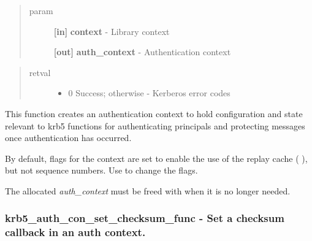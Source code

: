 \documentclass[letterpaper,10pt,english]{sphinxmanual}
\begin{document}
\begin{fulllineitems}
\label{appdev/refs/api/krb5_auth_con_init:c.krb5_auth_con_init}
\end{fulllineitems}

\begin{quote}\begin{description}
\item[{param}] \leavevmode
\textbf{{[}in{]}} \textbf{context} - Library context

\textbf{{[}out{]}} \textbf{auth\_context} - Authentication context

\end{description}\end{quote}
\begin{quote}\begin{description}
\item[{retval}] \leavevmode\begin{itemize}
\item {} 
0   Success; otherwise - Kerberos error codes

\end{itemize}

\end{description}\end{quote}

This function creates an authentication context to hold configuration and state relevant to krb5 functions for authenticating principals and protecting messages once authentication has occurred.

By default, flags for the context are set to enable the use of the replay cache ( {\hyperref[appdev/refs/macros/KRB5_AUTH_CONTEXT_DO_TIME:KRB5_AUTH_CONTEXT_DO_TIME]{}} ), but not sequence numbers. Use {\hyperref[appdev/refs/api/krb5_auth_con_setflags:c.krb5_auth_con_setflags]{}} to change the flags.

The allocated \emph{auth\_context} must be freed with {\hyperref[appdev/refs/api/krb5_auth_con_free:c.krb5_auth_con_free]{}} when it is no longer needed.


\subsubsection{krb5\_auth\_con\_set\_checksum\_func -  Set a checksum callback in an auth context.}
\label{appdev/refs/api/krb5_auth_con_set_checksum_func:krb5-auth-con-set-checksum-func-set-a-checksum-callback-in-an-auth-context}\label{appdev/refs/api/krb5_auth_con_set_checksum_func::doc}
\end{document}
